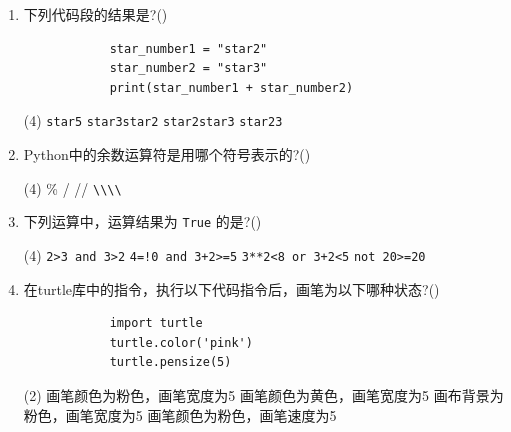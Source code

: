 \documentclass[11pt]{ctexart}
\begin{document}
\begin{enumerate}
        \item 下列代码段的结果是?(\qquad)
        \begin{lstlisting}
            star_number1 = "star2"
            star_number2 = "star3"
            print(star_number1 + star_number2)
        \end{lstlisting}
        \begin{tasks}(4)
            \task \lstinline{star5}
            \task \lstinline{star3star2}
            \task \lstinline{star2star3}
            \task \lstinline{star23}
        \end{tasks}

        \item Python中的余数运算符是用哪个符号表示的?(\qquad)
        \begin{tasks}(4)
            \task \%
            \task /
            \task //
            \task \lstinline!\\\\!
        \end{tasks}

        \item 下列运算中，运算结果为 \lstinline!True! 的是?(\qquad)
        \begin{tasks}(4)
            \task \lstinline!2>3 and 3>2!
            \task \lstinline{4=!0 and 3+2>=5}
            \task \lstinline!3**2<8 or 3+2<5!
            \task \lstinline!not 20>=20!
        \end{tasks}

        \item 在turtle库中的指令，执行以下代码指令后，画笔为以下哪种状态?(\qquad)
        \begin{lstlisting}
            import turtle
            turtle.color('pink')
            turtle.pensize(5)
        \end{lstlisting}
        \begin{tasks}(2)
            \task 画笔颜色为粉色，画笔宽度为5
            \task 画笔颜色为黄色，画笔宽度为5
            \task 画布背景为粉色，画笔宽度为5
            \task 画笔颜色为粉色，画笔速度为5
        \end{tasks}


\end{enumerate}
\end{document}
